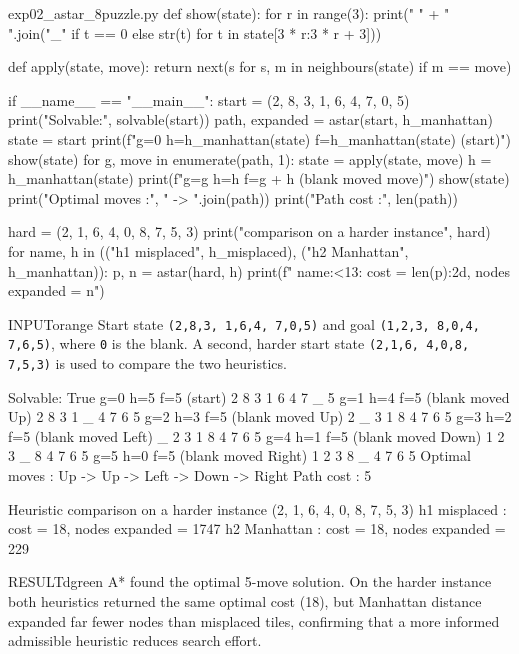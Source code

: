 \documentclass[11pt,a4paper]{article}
\newenvironment{inputbox}{\begin{secbox}{INPUT}{orange}}{\end{secbox}}
\newenvironment{result}{\begin{secbox}{RESULT}{dgreen}}{\end{secbox}}
\begin{document}
\begin{pycode}{exp02\_astar\_8puzzle.py}
def show(state):
    for r in range(3):
        print("   " + " ".join("_" if t == 0 else str(t)
                               for t in state[3 * r:3 * r + 3]))


def apply(state, move):
    return next(s for s, m in neighbours(state) if m == move)


if __name__ == "__main__":
    start = (2, 8, 3,
             1, 6, 4,
             7, 0, 5)
    print("Solvable:", solvable(start))
    path, expanded = astar(start, h_manhattan)
    state = start
    print(f"g=0 h={h_manhattan(state)} f={h_manhattan(state)}  (start)")
    show(state)
    for g, move in enumerate(path, 1):
        state = apply(state, move)
        h = h_manhattan(state)
        print(f"g={g} h={h} f={g + h}  (blank moved {move})")
        show(state)
    print("Optimal moves :", " -> ".join(path))
    print("Path cost     :", len(path))

    hard = (2, 1, 6,
            4, 0, 8,
            7, 5, 3)
    print("\nHeuristic comparison on a harder instance", hard)
    for name, h in (("h1 misplaced", h_misplaced), ("h2 Manhattan", h_manhattan)):
        p, n = astar(hard, h)
        print(f"  {name:<13}: cost = {len(p):2d}, nodes expanded = {n}")
\end{pycode}

\begin{inputbox}
Start state \texttt{(2,8,3, 1,6,4, 7,0,5)} and goal \texttt{(1,2,3, 8,0,4, 7,6,5)}, where \texttt{0} is the blank. A second, harder start state \texttt{(2,1,6, 4,0,8, 7,5,3)} is used to compare the two heuristics.
\end{inputbox}

\begin{outputbox}
Solvable: True
g=0 h=5 f=5  (start)
   2 8 3
   1 6 4
   7 _ 5
g=1 h=4 f=5  (blank moved Up)
   2 8 3
   1 _ 4
   7 6 5
g=2 h=3 f=5  (blank moved Up)
   2 _ 3
   1 8 4
   7 6 5
g=3 h=2 f=5  (blank moved Left)
   _ 2 3
   1 8 4
   7 6 5
g=4 h=1 f=5  (blank moved Down)
   1 2 3
   _ 8 4
   7 6 5
g=5 h=0 f=5  (blank moved Right)
   1 2 3
   8 _ 4
   7 6 5
Optimal moves : Up -> Up -> Left -> Down -> Right
Path cost     : 5

Heuristic comparison on a harder instance (2, 1, 6, 4, 0, 8, 7, 5, 3)
  h1 misplaced : cost = 18, nodes expanded = 1747
  h2 Manhattan : cost = 18, nodes expanded = 229
\end{outputbox}

\begin{result}
A* found the optimal 5-move solution. On the harder instance both heuristics returned the same optimal cost (18), but Manhattan distance expanded far fewer nodes than misplaced tiles, confirming that a more informed admissible heuristic reduces search effort.
\end{result}
\end{document}
